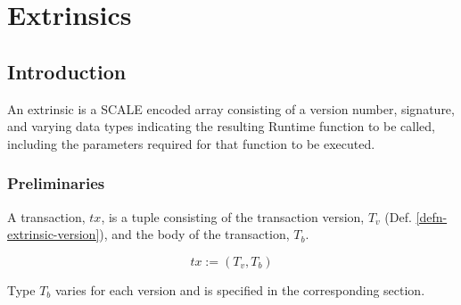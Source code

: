 \newpage
\chapter{Extrinsics}

\section{Introduction}

An extrinsic is a SCALE encoded array consisting of a version number,
signature, and varying data types indicating the resulting Runtime function to
be called, including the parameters required for that function to be executed.
\newline

\subsection{Preliminaries}

\begin{definition}
    A transaction, $tx$, is a tuple consisting of the transaction version,
    $T_v$ (Def. \ref{defn-extrinsic-version}), and the body of the transaction, $T_b$.

    \[
        tx := (T_v, T_b)
    \]

    Type $T_b$ varies for each version and is specified in the corresponding
    section.
\end{definition}

